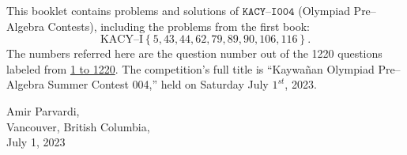 \documentclass[12pt,a4paper]{memoir}
\theoremstyle{definition}
\begin{document}
		This booklet contains problems and solutions of $\texttt{KACY--I004}$ (Olympiad Pre--Algebra Contests), including the problems from the first book: $$\text{KACY--I}\left\{5,43,44,62,79,89,90,106,116\right\}.$$ The numbers referred here are the question number out of the 1220 questions labeled from \href{https://github.com/parvardi/KACY/blob/main/KACY-VOL-I.pdf}{1 to 1220}. The competition's full title is ``Kaywañan Olympiad Pre--Algebra Summer Contest 004,'' held on Saturday July $1^{st}$, 2023.
%	
\Large
		\begin{flushright}
			Amir Parvardi,\\
			Vancouver, British Columbia,\\
			July 1, 2023
		\end{flushright}
	
\end{document}
